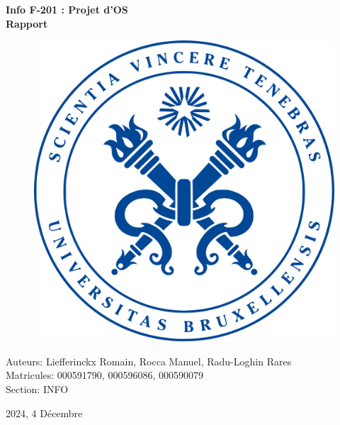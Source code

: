 \documentclass[utf8]{article}
\begin{document}
\begin{titlepage}
    \centering
    
    \vspace*{1cm}
    {\huge \bfseries Info F-201 : Projet d’OS \\
                    Rapport \par}
    
    \vfill
    
    \begin{figure}[h]
        \centering
        \includegraphics[scale=0.2]{logo.png}
    \end{figure}
    
    \vfill
    
    {\large Auteurs: Liefferinckx Romain, Rocca Manuel, Radu-Loghin Rares\\ 
            Matricules: 000591790, 000596086, 000590079 \\ 
            Section: INFO \par}
    {\large 2024, 4 Décembre \par}
\end{titlepage}
\end{document}
